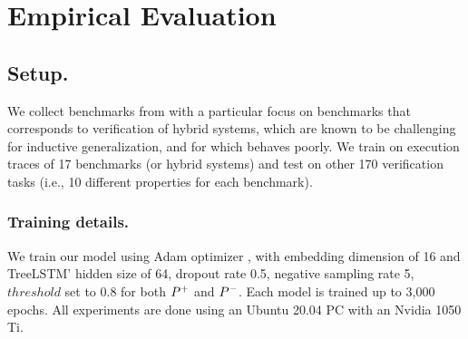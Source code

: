 



\section{Empirical Evaluation}
\label{sec:dopey-exp}

\subsection{Setup.} 
We collect benchmarks from \chccomp\cite{CHC-COMP-18} with a particular focus on benchmarks 
that corresponds to verification of hybrid systems, which are known to be challenging for inductive generalization, and for which \spc behaves poorly.
We train \dpy on execution traces of 17 benchmarks (or hybrid systems) and test \dpy on other 170 verification tasks (i.e., 10 different properties for each benchmark).

\noindent
\subsubsection{Training details.} 
We train our model using Adam optimizer \cite{adam}, with embedding dimension of 16 and TreeLSTM' hidden size of 64, dropout rate 0.5, negative sampling rate 5, $\mathit{threshold}$ set to 0.8 for both $P^+$ and $P^-$. Each model is trained up to 3,000 epochs. All experiments are done using an Ubuntu 20.04 PC with an Nvidia 1050 Ti. 

